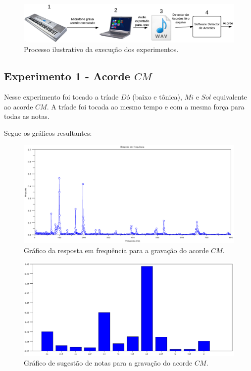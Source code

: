\begin{figure}[h]
	\centering
		\includegraphics[keepaspectratio=true,scale=0.35]{figuras/processo_experimento.eps}
	\caption{Processo ilustrativo da execução dos experimentos.}
  \label{fig:processo}
\end{figure}


\subsection{Experimento 1 - Acorde $CM$}
\label{sec:experimento1}

Nesse experimento foi tocado a tríade $Dó$ (baixo e tônica), $Mi$ e $Sol$ equivalente ao acorde $CM$. A tríade foi tocada ao mesmo tempo e com a mesma força para todas as notas.

Segue os gráficos resultantes:

\begin{figure}[h]
	\centering
		\includegraphics[keepaspectratio=true,scale=0.49]{figuras/CM/fft_cm.eps}
	\caption{Gráfico da resposta em frequência para a gravação do acorde $CM$.}
  \label{fig:espectro_CM}
\end{figure}

\begin{figure}[h]
	\centering
		\includegraphics[keepaspectratio=true,scale=0.49]{figuras/CM/notas_cm.eps}
	\caption{Gráfico de sugestão de notas para a gravação do acorde $CM$.}
  \label{fig:notas_CM}
\end{figure}

